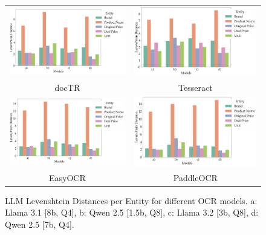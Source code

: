 \documentclass[11pt]{article}
\begin{document}
\begin{figure}[h!]
    \begin{tabular}{cc}
        \includegraphics[width=0.5\linewidth]{figures/doctr_ocr_levdistances.png} &   \includegraphics[width=0.5\linewidth]{figures/tesseract_ocr_levdistances.png} \\
    docTR & Tesseract \\[6pt]
        \includegraphics[width=0.5\linewidth]{figures/easyocr_ocr_levdistances.png} &   \includegraphics[width=0.5\linewidth]{figures/ppocr_ocr_levdistances.png} \\
    EasyOCR & PaddleOCR \\[6pt]
    \end{tabular}
    \caption{LLM Levenshtein Distances per Entity for different OCR models. a: Llama 3.1 [8b, Q4], b: Qwen 2.5 [1.5b, Q8], c: Llama 3.2 [3b, Q8], d: Qwen 2.5 [7b, Q4].}
    \label{fig:eval_ocr_llm_levdistances}
\end{figure}
\end{document}
